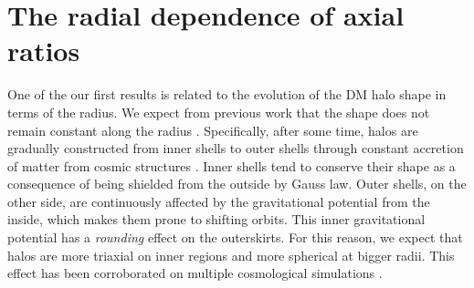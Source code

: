 \section{The radial dependence of axial ratios}
One of the our first results is related to the evolution of the DM halo shape in terms of the radius. We expect from previous work that the shape does not remain constant along the radius \cite{Vera-Ciro_et_al._2011}. Specifically, after some time, halos are gradually constructed from inner shells to outer shells through constant accretion of matter from cosmic structures \cite{Tormen_et_al._1997,Tormen_et_al._1998}. Inner shells tend to conserve their shape as a consequence of being shielded from the outside by Gauss law. Outer shells, on the other side, are continuously affected by the gravitational potential from the inside, which makes them prone to shifting orbits. This inner gravitational potential has a \textit{rounding} effect on the outerskirts. For this reason, we expect that halos are more triaxial on inner regions and more spherical at bigger radii. This effect has been corroborated on multiple cosmological simulations \cite{Frenk_et_al._1988,Dubinski_and_Carlberg_1991,Warren_et_al._1992,Cole_and_Lacey_1996,Hayashi_et_al._2007,Bett_et_al._2007,Vera-Ciro_et_al._2011}. \\


